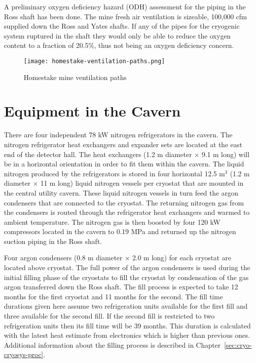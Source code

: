 A preliminary oxygen deficiency hazard (ODH) assessment for the piping in the Ross shaft has
been done. The mine fresh air ventilation is sizeable, 100,000 cfm supplied down the Ross and
Yates shafts. If any of the pipes for the cryogenic system ruptured in the shaft they would only
be able to reduce the oxygen content to a fraction of 20.5\%, thus not being an oxygen
deficiency concern.

\begin{figure}[htbp]
\centering
\texttt{[image: homestake-ventilation-paths.png]} 
\caption{Homestake mine ventilation paths}
\label{fig:ventilation-paths}
\end{figure}


\chapter{Equipment in the Cavern}
\label{sec:cryo-cryosys-equip-cavern}

There are four independent 78 kW nitrogen refrigerators in the cavern. The nitrogen
refrigerator heat exchangers and expander sets are located at the east end of the detector hall.
The heat exchangers (1.2 m diameter $\times$ 9.1 m long) will be in a horizontal orientation in order to
fit them within the cavern. The liquid nitrogen produced by the refrigerators is stored in
four horizontal 12.5 m$^3$ (1.2 m diameter $\times$ 11 m long) liquid nitrogen vessels per cryostat that are mounted in the
central utility cavern. These liquid nitrogen vessels
in turn feed the argon condensers that are connected to the cryostat. The returning nitrogen
gas from the condensers is routed through the refrigerator heat exchangers and warmed to
ambient temperature. The nitrogen gas is then boosted by four 120 kW compressors located in
the cavern to 0.19 MPa and returned up the nitrogen suction piping in the Ross shaft.

 Four argon condensers (0.8 m diameter $\times$ 2.0 m long) for each cryostat are located above cryostat. The full power of the argon condensers is used during the initial 
filling phase of the cryostats to fill the cryostat by condensation of the gas argon transferred 
down the Ross shaft. The fill process is expected to take 12 months for the first cryostat and 11 months for the second. 
The fill time durations given here assume two refrigeration units available for the first fill and three available for the second fill. If the second fill is restricted to two refrigeration units then its fill time will be 39 months. This duration is calculated with the latest heat estimate from electronics which is higher than previous ones. Additional information about the filling process is described in Chapter~\ref{sec:cryo-cryosys-proc}.  

